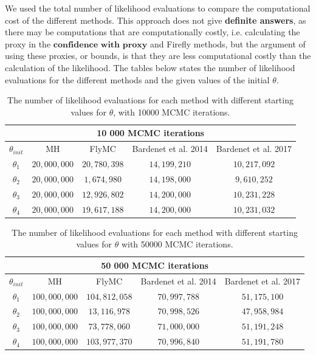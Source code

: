  We used the total number of likelihood evaluations to compare the computational cost of the different methods. This approach does not give \textbf{definite answers}, as there may be computations that are computationally costly, i.e. calculating the proxy in the $\textbf{confidence with proxy}$ and Firefly methods, but the argument of using these proxies, or bounds, is that they are less computational costly than the calculation of the likelihood. 
 The tables below states the number of likelihood evaluations for the different methods and the given values of the initial $\theta$. 
\begin{table}
    \centering
\begin{tabular}{|c|c|c|c|c|}
  \hline
    \multicolumn{5}{|c|}{10 000 MCMC iterations} \\
    \hline
\hline
        $\theta_{init}$ &  MH & FlyMC & Bardenet et al. 2014 & Bardenet et al. 2017\\ 
         \hline \hline$\theta_1$ & $20,000,000$ & $20,780,398$ & $14,199,210$ & $10,217,092$ \\
        $\theta_2$ & $20,000,000$ & $1,674,980$ & $14,198,000$ & $9,610,252$ \\
        $\theta_3$ & $20,000,000$ & $12,926,802$ & $14,200,000$ & $10,231,228$
        \\ $ \theta_4$ & $20,000,000$ & $19,617,188$ & $14,200,000$ & $10,231,032$
        \\ \hline
\end{tabular}
\caption{The number of likelihood evaluations for each method with different starting values for $\theta$, with 10000 MCMC iterations.}
\label{tab:ll_evals_10k}
\end{table} 

 \begin{table}
    \centering
\begin{tabular}{|c|c|c|c|c|}
  \hline
    \multicolumn{5}{|c|}{50 000 MCMC iterations} \\
    \hline
\hline
        $\theta_{init}$ &  MH & FlyMC & Bardenet et al. 2014 & Bardenet et al. 2017\\ 
         \hline \hline$\theta_1$ & $100,000,000$ & $104,812,058$ & $70,997,788$ & $51,175,100$ \\
        $\theta_2$ & $100,000,000$ & $13,116,978$ & $70,998,526$ & $47,958,984$ \\
        $\theta_3$ & $100,000,000$ & $73,778,060$ & $71,000,000$ & $51,191,248$
        \\ $ \theta_4$ & $100,000,000$ & $103,977,370$ & $70,996,840$ & $51,191,780$
        \\ \hline
\end{tabular}
\caption{The number of likelihood evaluations for each method with different starting values for $\theta$ with 50000 MCMC iterations.}
\label{tab:ll_evals_50k}
\end{table} 

